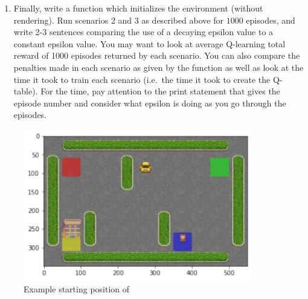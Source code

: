 \begin{problem}
\begin{enumerate}
\item Finally, write a function  which initializes the  environment (without rendering).
Run scenarios 2 and 3 as described above for $1000$ episodes, and write 2-3 sentences comparing the use of a decaying epsilon value to a constant epsilon value.
You may want to look at average Q-learning total reward of 1000 episodes returned by each scenario.
You can also compare the penalties made in each scenario as given by the  function as well as look at the time it took to train each scenario (i.e.\ the time it took to create the Q-table).
For the time, pay attention to the print statement that gives the episode number and consider what epsilon is doing as you go through the episodes.
\label{prob:taxi}
\end{enumerate}
\end{problem}

\begin{figure}[H]
    \includegraphics[width=10cm]{figures/taxi.pdf}
    \caption{Example starting position of }
    \label{fig:taxi}
\end{figure}

